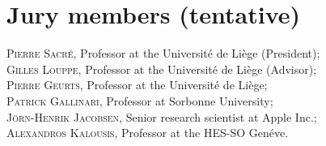 
\chapter*{Jury members (tentative)}


\noindent \textsc{Pierre Sacr{\'e}}, Professor at the Universit{\'e} de Li{\`e}ge (President); \\

\noindent \textsc{Gilles Louppe}, Professor at the Universit{\'e} de Li{\`e}ge (Advisor); \\

\noindent \textsc{Pierre Geurts}, Professor at the Universit{\'e} de Li{\`e}ge; \\

\noindent \textsc{Patrick Gallinari}, Professor at Sorbonne University; \\

\noindent \textsc{J{\"o}rn-Henrik Jacobsen}, Senior research scientist at Apple Inc.; \\

\noindent \textsc{Alexandros Kalousis}, Professor at the HES-SO Gen{\'e}ve. \\
